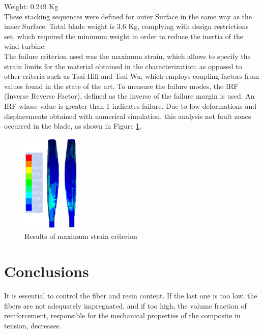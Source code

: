 \hspace{2cm}Weight: 0.249 Kg\\

These stacking sequences were defined for outer Surface in the same way as the inner Surface. Total blade weight is 3.6 Kg, complying with design restrictions set, which required the minimum weight in order to reduce the inertia of the wind turbine. \\

The failure criterion used was the maximum strain, which allows to specify the strain limits for the material obtained in the characterization; as opposed to other criteria such as Tsai-Hill and Tsai-Wu, which employs coupling factors from values found in the state of the art. To measure the failure modes, the IRF (Inverse Reverse Factor), defined as the inverse of the failure margin is used. An IRF whose value is greater than 1 indicates failure. Due to low deformations and displacements obtained with numerical simulation, this analysis not fault zones occurred in the blade, as shown in Figure \ref{fig:20}.

\begin{figure}[H]
\begin{center}
  \includegraphics[width=0.25\textwidth]{p13}
\caption{Results of maximum strain criterion }
\label{fig:20}       %
\end{center}
\end{figure}

\section{Conclusions}
\label{sec:6}
It is essential to control the fiber and resin content. If the last one is too low, the fibers are not adequately impregnated, and if too high, the volume fraction of reinforcement, responsible for the mechanical properties of the composite in tension, decreases.\\

